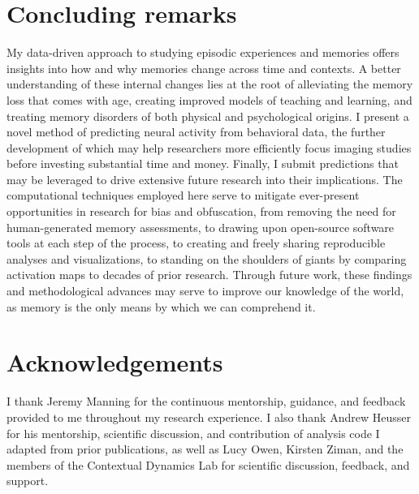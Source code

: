 \documentclass{article}
\begin{document}
\section*{Concluding remarks}

My data-driven approach to studying episodic experiences and memories offers insights into how and why memories change across time and contexts.  A better understanding of these internal changes lies at the root of alleviating the memory loss that comes with age, creating improved models of teaching and learning, and treating memory disorders of both physical and psychological origins.  I present a novel method of predicting neural activity from behavioral data, the further development of which may help researchers more efficiently focus imaging studies before investing substantial time and money.  Finally, I submit predictions that may be leveraged to drive extensive future research into their implications.  The computational techniques employed here serve to mitigate ever-present opportunities in research for bias and obfuscation, from removing the need for human-generated memory assessments, to drawing upon open-source software tools at each step of the process, to creating and freely sharing reproducible analyses and visualizations, to standing on the shoulders of giants by comparing activation maps to decades of prior research.  Through future work, these findings and methodological advances may serve to improve our knowledge of the world, as memory is the only means by which we can comprehend it.  

\section*{Acknowledgements}

I thank Jeremy Manning for the continuous mentorship, guidance, and feedback provided to me throughout my research experience.  I also thank Andrew Heusser for his mentorship, scientific discussion, and contribution of analysis code I adapted from prior publications, as well as Lucy Owen, Kirsten Ziman, and the members of the Contextual Dynamics Lab for scientific discussion, feedback, and support.


\end{document}
